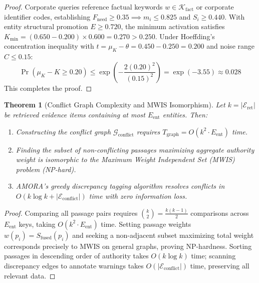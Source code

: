 \documentclass[conference,onecolumn,10pt]{IEEEtran}
\newtheorem{theorem}{Theorem}
\begin{document}
\begin{proof}
Corporate queries reference factual keywords $w \in \mathcal{K}_{\text{fact}}$ or corporate identifier codes, establishing $F_{\text{need}} \ge 0.35 \implies m_i \le 0.825$ and $S_i \ge 0.440$. With entity structural promotion $E \ge 0.720$, the minimum activation satisfies $K_{\text{min}} = (0.650 - 0.200) \times 0.600 = 0.270 > 0.250$. Under Hoeffding's concentration inequality with $t = \mu_K - \theta = 0.450 - 0.250 = 0.200$ and noise range $C \le 0.15$:
\begin{equation}
    \Pr(\mu_K - K \ge 0.20) \le \exp\left( - \frac{2 (0.20)^2}{(0.15)^2} \right) = \exp(-3.55) \approx 0.028
\end{equation}
This completes the proof.
\end{proof}

\begin{theorem}[Conflict Graph Complexity and MWIS Isomorphism]
\label{thm:conflict}
Let $k = |\mathcal{E}_{\text{ret}}|$ be retrieved evidence items containing at most $E_{\text{ent}}$ entities. Then:
\begin{enumerate}
    \item Constructing the conflict graph $\mathcal{G}_{\text{conflict}}$ requires $T_{\text{graph}} = O(k^2 \cdot E_{\text{ent}})$ time.
    \item Finding the subset of non-conflicting passages maximizing aggregate authority weight is isomorphic to the Maximum Weight Independent Set (MWIS) problem (NP-hard).
    \item AMORA's greedy discrepancy tagging algorithm resolves conflicts in $O(k \log k + |\mathcal{E}_{\text{conflict}}|)$ time with zero information loss.
\end{enumerate}
\end{theorem}

\begin{proof}
Comparing all passage pairs requires $\binom{k}{2} = \frac{k(k-1)}{2}$ comparisons across $E_{\text{ent}}$ keys, taking $O(k^2 \cdot E_{\text{ent}})$ time. Setting passage weights $w(p_i) = S_{\text{fused}}(p_i)$ and seeking a non-adjacent subset maximizing total weight corresponds precisely to MWIS on general graphs, proving NP-hardness. Sorting passages in descending order of authority takes $O(k \log k)$ time; scanning discrepancy edges to annotate warnings takes $O(|\mathcal{E}_{\text{conflict}}|)$ time, preserving all relevant data.
\end{proof}
\end{document}
